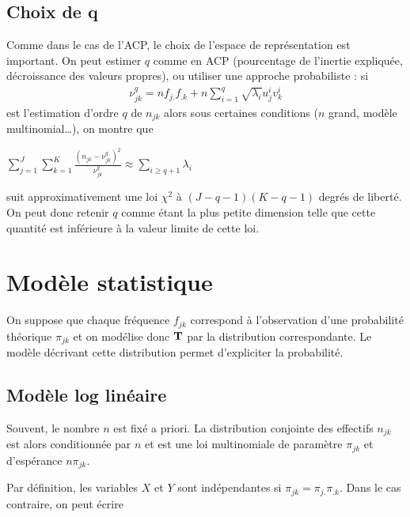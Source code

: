 \documentclass[letterpaper,10pt,french]{sphinxmanual}
\begin{document}
\subsection{Choix de q}
\label{\detokenize{afc:choix-de-q}}
\sphinxAtStartPar
Comme dans le cas de l’ACP, le choix de l’espace de représentation est important. On peut estimer \(q\) comme en ACP (pourcentage de l’inertie expliquée, décroissance des valeurs propres), ou utiliser une approche probabiliste : si
\begin{equation*}
\begin{split}\nu_{jk}^q = n f_{j.}f_{.k} + n\displaystyle\sum_{i=1}^q \sqrt{\lambda_i} u^i_jv^i_k\end{split}
\end{equation*}
\sphinxAtStartPar
est l’estimation d’ordre \(q\) de \(n_{jk}\) alors sous certaines conditions (\(n\) grand, modèle multinomial…), on montre que

\sphinxAtStartPar
\(\displaystyle\sum_{j=1}^J\displaystyle\sum_{k=1}^K\frac{\left (n_{jk}-\nu_{jk}^q \right )^2}{\nu_{jk}^q}\approx \displaystyle\sum_{i\geq q+1} \lambda_i\)

\sphinxAtStartPar
suit approximativement une loi \(\chi^2\) à \((J-q-1)(K-q-1)\) degrés de liberté. On peut donc retenir \(q\) comme étant la plus petite dimension telle que cette quantité est inférieure à la valeur limite de cette loi.


\section{Modèle statistique}
\label{\detokenize{afc:modele-statistique}}
\sphinxAtStartPar
On suppose que chaque fréquence \(f_{jk}\) correspond à l’observation d’une probabilité   théorique \(\pi_{jk}\) et on modélise donc \(\bf T\) par la distribution correspondante. Le modèle décrivant cette distribution permet d’expliciter la probabilité.


\subsection{Modèle log linéaire}
\label{\detokenize{afc:modele-log-lineaire}}
\sphinxAtStartPar
Souvent, le nombre \(n\) est fixé a priori. La distribution conjointe des effectifs \(n_{jk}\) est alors conditionnée par \(n\) et est une loi multinomiale de paramètre \(\pi_{jk}\) et d’espérance \(n\pi_{jk}\).

\sphinxAtStartPar
Par définition, les variables \(X\) et \(Y\) sont indépendantes si \(\pi_{jk}=\pi_{j.}\pi_{.k}\). Dans le cas contraire, on peut écrire
\end{document}
